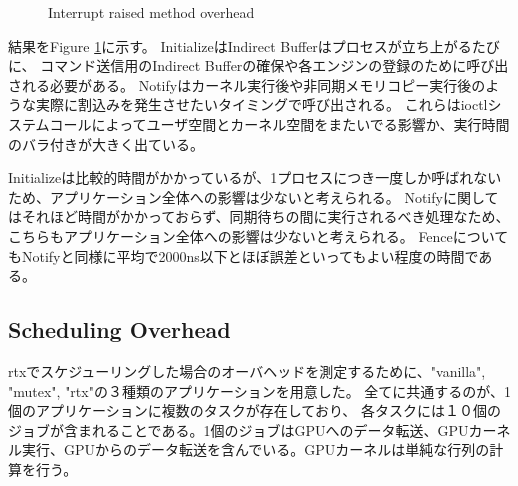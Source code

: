 \begin{figure}[!t]
\begin{center}
\caption{Interrupt raised method overhead}
\label{fig:irq_rise_overhead}
\end{center}
\end{figure}

結果をFigure \ref{fig:irq_rise_overhead}に示す。
InitializeはIndirect Bufferはプロセスが立ち上がるたびに、
コマンド送信用のIndirect Bufferの確保や各エンジンの登録のために呼び出される必要がある。
Notifyはカーネル実行後や非同期メモリコピー実行後のような実際に割込みを発生させたいタイミングで呼び出される。
これらはioctlシステムコールによってユーザ空間とカーネル空間をまたいでる影響か、実行時間のバラ付きが大きく出ている。

Initializeは比較的時間がかかっているが、1プロセスにつき一度しか呼ばれないため、アプリケーション全体への影響は少ないと考えられる。
Notifyに関してはそれほど時間がかかっておらず、同期待ちの間に実行されるべき処理なため、こちらもアプリケーション全体への影響は少ないと考えられる。
FenceについてもNotifyと同様に平均で2000ns以下とほぼ誤差といってもよい程度の時間である。

\subsection{Scheduling Overhead}\label{sec:eval:sched_overhead}

rtxでスケジューリングした場合のオーバヘッドを測定するために、"vanilla", "mutex", "rtx"の３種類のアプリケーションを用意した。
全てに共通するのが、1個のアプリケーションに複数のタスクが存在しており、
各タスクには１０個のジョブが含まれることである。1個のジョブはGPUへのデータ転送、GPUカーネル実行、GPUからのデータ転送を含んでいる。GPUカーネルは単純な行列の計算を行う。

